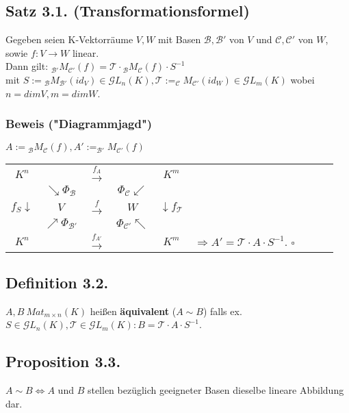\documentclass[a4paper, 12pt]{extarticle}
\begin{document}
\subsection*{Satz 3.1. (Transformationsformel)}
Gegeben seien K-Vektorräume $V, W$ mit Basen $\mathcal{B}, \mathcal{B'}$ von $V$ und $\mathcal{C}, \mathcal{C'}$ von $W$, sowie $f: V \longrightarrow W$ linear.\\ Dann gilt: $_\mathcal{B'}M_\mathcal{C'}(f) = \mathcal{T} \cdot {_\mathcal B}M_\mathcal{C}(f) \cdot S^{-1}$\\ mit $S := {_\mathcal B}M_\mathcal{B'}(id_V) \in \mathcal{G}L_n(K), \mathcal{T} := _\mathcal{C}M_\mathcal{C'}(id_W) \in \mathcal{G}L_m(K)$ wobei $n = dim V, m = dim W$.\\
\subsubsection*{Beweis ("Diagrammjagd")}
$A := {_\mathcal B}M_\mathcal{C}(f), A' := _\mathcal{B'}M_\mathcal{C'}(f)$\\
\begin{tabular}[h]{ccccccccc}
	 $K^n$ & & $\xrightarrow{f_A}$ & & $K^m$\\
	 & $\searrow \Phi{_\mathcal B}$ & & $\Phi_\mathcal{C} \swarrow$ & \\
	 $f_S \downarrow$ & $V$ & $\xrightarrow{f}$ & $W$ & $\downarrow f_\mathcal{T}$ \\
	 & $\nearrow \Phi_\mathcal{B'}$ & & $\Phi_\mathcal{C'} \nwarrow$ & \\
	 $K^n$ & & $\xrightarrow{f_{A'}}$ & & $K^m$ & $\Rightarrow A' = \mathcal{T} \cdot A \cdot S^{-1}$. $\square$\\
\end{tabular}

\subsection*{Definition 3.2.}
$A, B \ Mat_{m\times n}(K)$ heißen \textbf{äquivalent} ($A\sim B$) falls ex. $S \in \mathcal{G}L_n(K), \mathcal{T} \in \mathcal{G}L_m(K): B = \mathcal{T} \cdot A \cdot S^{-1}$.

\subsection*{Proposition 3.3.}
$A \sim B \Leftrightarrow A$ und $B$ stellen bezüglich geeigneter Basen dieselbe lineare Abbildung dar.
\end{document}
